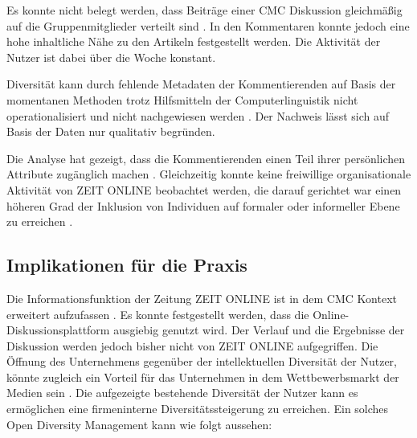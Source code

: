 \documentclass[12pt,a4paper,oneside]{article}
\begin{document}
\begin{titlepage}
\begin{flushleft}
Es konnte nicht belegt werden, dass Beiträge einer \ac{CMC} Diskussion gleich\-mä\-ßig auf die Gruppenmitglieder verteilt sind \cite{siegel1986group,mcguire1987group}. In den Kommentaren konnte jedoch eine hohe inhaltliche Nähe zu den Artikeln festgestellt werden. Die Aktivität der Nutzer ist dabei über die Woche konstant.

Diversität kann durch fehlende Metadaten der Kommentierenden auf Basis der momentanen Methoden trotz Hilfsmitteln der Computerlinguistik nicht operationalisiert und nicht nachgewiesen werden \cite{lawrence1997perspective,lapid1998diversity,harrison1998beyond,harrison2007s}. Der Nachweis lässt sich auf Basis der Daten nur qualitativ begründen. 

Die Analyse hat gezeigt, dass die Kommentierenden einen Teil ihrer persön\-lichen Attribute zugänglich machen \cite{van2004work,vashanti2012}. Gleichzeitig konnte keine freiwillige organisationale Aktivität von ZEIT ONLINE beobachtet werden, die darauf gerichtet war einen höheren Grad der Inklusion von Individuen auf formaler oder informeller Ebene zu erreichen \cite{gilbert1999dm,ewoh2013}. 

 

\subsection{Implikationen für die Praxis}
Die Informationsfunktion der Zeitung ZEIT ONLINE ist in dem CMC Kontext erweitert aufzufassen \cite{neuberger1999online}. Es konnte festgestellt werden, dass die Online-Diskussionsplattform ausgiebig genutzt wird. Der Verlauf und die Ergebnisse der Diskussion werden jedoch bisher nicht von ZEIT ONLINE aufgegriffen. Die Öffnung des Unternehmens gegenüber der intellektuellen Diversität der Nutzer, könnte zugleich ein Vorteil für das Unternehmen in dem Wettbewerbsmarkt der Medien sein \cite{gassmann2006open,stachbert,enkel2014applying}. Die aufgezeigte bestehende Diversität der Nutzer kann es ermöglichen eine firmeninterne Diversitätssteigerung zu erreichen. Ein solches Open Diversity Management kann wie folgt aussehen:


\end{flushleft}
\end{titlepage}
\end{document}
